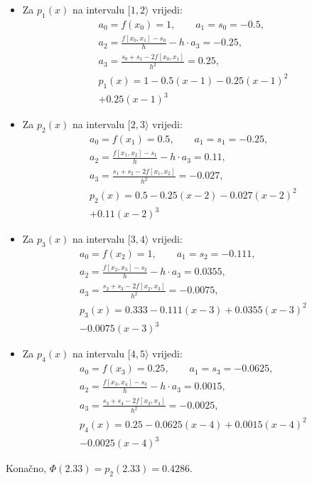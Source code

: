 \begin{multicols}{2}
\begin{itemize}
\item Za $p_1(x)$ na intervalu $[1,2\rangle$ vrijedi:
    \begin{gather*}
    a_0=f(x_0)=1,\qquad a_1=s_0=-0.5,\\
    a_2=\frac{f[x_0,x_1]-s_0}{h}-h\cdot a_3=-0.25,\\
    a_3=\frac{s_0+s_1-2f[x_0,x_1]}{h^2}=0.25,\\
    p_1(x)=1-0.5(x-1)-0.25(x-1)^2\\+0.25(x-1)^3
    \end{gather*}
\item Za $p_2(x)$ na intervalu $[2,3\rangle$ vrijedi:
    \begin{gather*}
    a_0=f(x_1)=0.5,\qquad a_1=s_1=-0.25,\\
    a_2=\frac{f[x_1,x_2]-s_1}{h}-h\cdot a_3=0.11,\\
    a_3=\frac{s_1+s_2-2f[x_1,x_2]}{h^2}=-0.027,\\
    p_2(x)=0.5-0.25(x-2)-0.027(x-2)^2\\+0.11(x-2)^3
    \end{gather*}
\newcolumn
\item Za $p_3(x)$ na intervalu $[3,4\rangle$ vrijedi:
    \begin{gather*}
    a_0=f(x_2)=1,\qquad a_1=s_2=-0.111,\\
    a_2=\frac{f[x_2,x_3]-s_2}{h}-h\cdot a_3=0.0355,\\
    a_3=\frac{s_2+s_3-2f[x_2,x_3]}{h^2}=-0.0075,\\
    p_3(x)=0.333-0.111(x-3)+0.0355(x-3)^2\\-0.0075(x-3)^3
    \end{gather*}
\item Za $p_4(x)$ na intervalu $[4,5\rangle$ vrijedi:
    \begin{gather*}
    a_0=f(x_3)=0.25,\qquad a_1=s_3=-0.0625,\\
    a_2=\frac{f[x_3,x_4]-s_3}{h}-h\cdot a_3=0.0015,\\
    a_3=\frac{s_3+s_4-2f[x_3,x_4]}{h^2}=-0.0025,\\
    p_4(x)=0.25-0.0625(x-4)+0.0015(x-4)^2\\-0.0025(x-4)^3
    \end{gather*}
\end{itemize}
\end{multicols}

Konačno, $\Phi(2.33)=p_2(2.33)=0.4286$.

